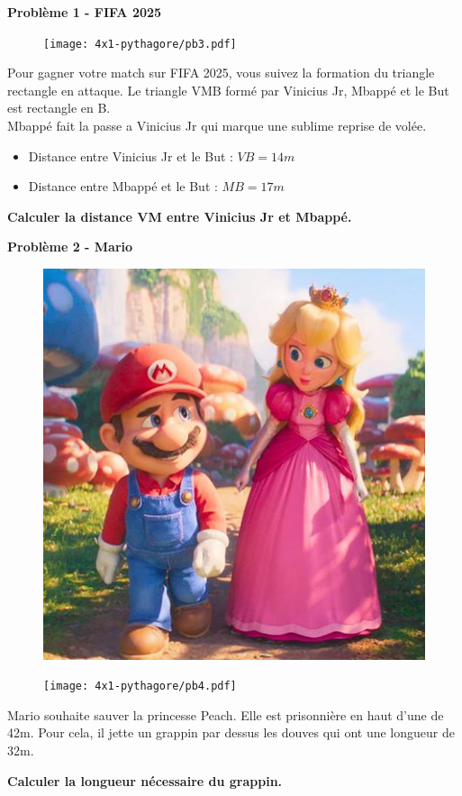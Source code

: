 \textbf{Problème 1 - FIFA 2025} \\

\begin{figure}[H]
  \centering
  \texttt{[image: 4x1-pythagore/pb3.pdf]}
\end{figure}
  
Pour gagner votre match sur FIFA 2025, vous suivez la formation du triangle rectangle en attaque. Le triangle VMB formé par Vinicius Jr, Mbappé et le But est rectangle en B. \\
  
Mbappé fait la passe a Vinicius Jr qui marque une sublime reprise de volée. 
  
\begin{itemize}
  \item Distance entre Vinicius Jr et le But : $VB = 14m$
  \item Distance entre Mbappé et le But : $MB = 17m$
\end{itemize}
  
\textbf{Calculer la distance VM entre Vinicius Jr et Mbappé.} 

\newpage

\begin{multicols}{2} 
  \textbf{Problème 2 - Mario} \\
  
  \begin{figure}[H]
    \centering
    \includegraphics[width=0.3\linewidth]{4x1-pythagore/pb4-mario.png}
  \end{figure}

  \begin{figure}[H]
    \centering
    \texttt{[image: 4x1-pythagore/pb4.pdf]}
  \end{figure}
\end{multicols}

Mario souhaite sauver la princesse Peach. Elle est prisonnière en haut d'une de 42m. Pour cela, il jette un grappin par dessus les douves qui ont une longueur de 32m.
  
\textbf{Calculer la longueur nécessaire du grappin.} \\

